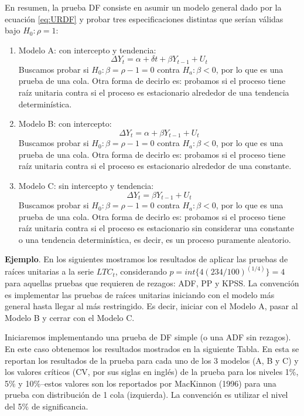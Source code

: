 \documentclass[
]{book}
\begin{document}
En resumen, la prueba DF consiste en asumir un modelo general dado por la ecuación \eqref{eq:URDF} y probar tres especificaciones distintas que serían válidas bajo \(H_0 : \rho = 1\):

\begin{enumerate}
\def\labelenumi{\arabic{enumi}.}
\item
  Modelo A: con intercepto y tendencia:
  \begin{equation*}
   \Delta Y_t = \alpha + \delta t + \beta Y_{t-1} + U_t
    \end{equation*}
  Buscamos probar si \(H_0 : \beta = \rho - 1 = 0\) contra \(H_a : \beta < 0\), por lo que es una prueba de una cola. Otra forma de decirlo es: probamos si el proceso tiene raíz unitaria contra si el proceso es estacionario alrededor de una tendencia determinística.
\item
  Modelo B: con intercepto:
  \begin{equation*}
   \Delta Y_t = \alpha + \beta Y_{t-1} + U_t
    \end{equation*}
  Buscamos probar si \(H_0 : \beta = \rho - 1 = 0\) contra \(H_a : \beta < 0\), por lo que es una prueba de una cola. Otra forma de decirlo es: probamos si el proceso tiene raíz unitaria contra si el proceso es estacionario alrededor de una constante.
\item
  Modelo C: sin intercepto y tendencia:
  \begin{equation*}
   \Delta Y_t = \beta Y_{t-1} + U_t
    \end{equation*}
  Buscamos probar si \(H_0 : \beta = \rho - 1 = 0\) contra \(H_a : \beta < 0\), por lo que es una prueba de una cola. Otra forma de decirlo es: probamos si el proceso tiene raíz unitaria contra si el proceso es estacionario sin considerar una constante o una tendencia determinística, es decir, es un proceso puramente aleatorio.
\end{enumerate}

\textbf{Ejemplo}. En los siguientes mostramos los resultados de aplicar las pruebas de raíces unitarias a la serie \(LTC_t\), considerando \(p = int \{ 4 (234/100)^{(1/4)} \} = 4\) para aquellas pruebas que requieren de rezagos: ADF, PP y KPSS. La convención es implementar las pruebas de raíces unitarias iniciando con el modelo más general hasta llegar al más restringido. Es decir, iniciar con el Modelo A, pasar al Modelo B y cerrar con el Modelo C.

Iniciaremos implementando una prueba de DF simple (o una ADF sin rezagos). En este caso obtenemos los resultados mostrados en la siguiente Tabla. En esta se reportan los resultados de la prueba para cada uno de los 3 modelos (A, B y C) y los valores críticos (CV, por sus siglas en inglés) de la prueba para los niveles 1\%, 5\% y 10\%--estos valores son los reportados por MacKinnon (1996) para una prueba con distribución de 1 cola (izquierda). La convención es utilizar el nivel del 5\% de significancia.
\end{document}
